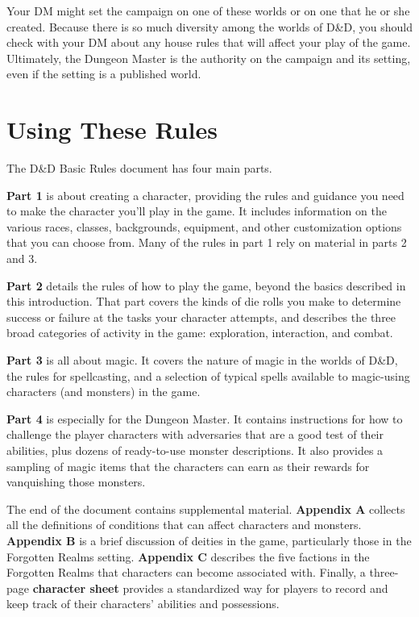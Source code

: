 Your DM might set the campaign on one of these worlds or on one that he or she created. Because there is so much diversity among the worlds of D\&D, you should check with your DM about any house rules that will affect your play of the game. Ultimately, the Dungeon Master is the authority on the campaign and its setting, even if the setting is a published world.

\section{Using These Rules}
The D\&D Basic Rules document has four main parts.

\textbf{Part 1} is about creating a character, providing the rules and guidance you need to make the character you’ll play in the game. It includes information on the various races, classes, backgrounds, equipment, and other customization options that you can choose from. Many of the rules in part 1 rely on material in parts 2 and 3.

\textbf{Part 2} details the rules of how to play the game, beyond the basics described in this introduction. That part covers the kinds of die rolls you make to determine success or failure at the tasks your character attempts, and describes the three broad categories of activity in the game: exploration, interaction, and combat.

\textbf{Part 3} is all about magic. It covers the nature of magic in the worlds of D\&D, the rules for spellcasting, and a selection of typical spells available to magic-using characters (and monsters) in the game.

\textbf{Part 4} is especially for the Dungeon Master. It contains instructions for how to challenge the player characters with adversaries that are a good test of their abilities, plus dozens of ready-to-use monster descriptions. It also provides a sampling of magic items that the characters can earn as their rewards for vanquishing those monsters.

The end of the document contains supplemental material. \textbf{Appendix A} collects all the definitions of conditions that can affect characters and monsters. \textbf{Appendix B} is a brief discussion of deities in the game, particularly those in the Forgotten Realms setting. \textbf{Appendix C} describes the five factions in the Forgotten Realms that characters can become associated with. Finally, a three-page \textbf{character sheet} provides a standardized way for players to record and keep track of their characters’ abilities and possessions.

